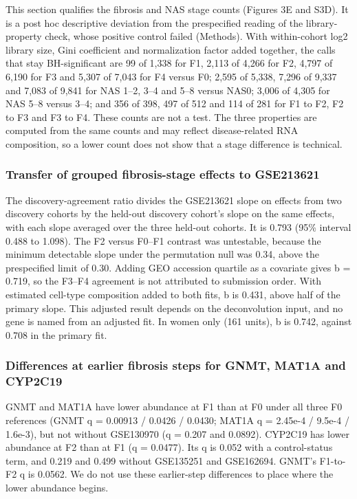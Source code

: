 This section qualifies the fibrosis and NAS stage counts (Figures 3E and S3D). It is a post hoc descriptive deviation from the prespecified reading of the library-property check, whose positive control failed (Methods). With within-cohort log2 library size, Gini coefficient and normalization factor added together, the calls that stay BH-significant are 99 of 1,338 for F1, 2,113 of 4,266 for F2, 4,797 of 6,190 for F3 and 5,307 of 7,043 for F4 versus F0; 2,595 of 5,338, 7,296 of 9,337 and 7,083 of 9,841 for NAS 1--2, 3--4 and 5--8 versus NAS0; 3,006 of 4,305 for NAS 5--8 versus 3--4; and 356 of 398, 497 of 512 and 114 of 281 for F1 to F2, F2 to F3 and F3 to F4. These counts are not a test. The three properties are computed from the same counts and may reflect disease-related RNA composition, so a lower count does not show that a stage difference is technical.

\subsubsection{Transfer of grouped fibrosis-stage effects to GSE213621}\label{transfer-of-grouped-fibrosis-stage-effects-to-gse213621}

The discovery-agreement ratio divides the GSE213621 slope on effects from two discovery cohorts by the held-out discovery cohort's slope on the same effects, with each slope averaged over the three held-out cohorts. It is 0.793 (95\% interval 0.488 to 1.098). The F2 versus F0--F1 contrast was untestable, because the minimum detectable slope under the permutation null was 0.34, above the prespecified limit of 0.30. Adding GEO accession quartile as a covariate gives b = 0.719, so the F3--F4 agreement is not attributed to submission order. With estimated cell-type composition added to both fits, b is 0.431, above half of the primary slope. This adjusted result depends on the deconvolution input, and no gene is named from an adjusted fit. In women only (161 units), b is 0.742, against 0.708 in the primary fit.

\subsubsection{Differences at earlier fibrosis steps for GNMT, MAT1A and CYP2C19}\label{differences-at-earlier-fibrosis-steps-for-gnmt-mat1a-and-cyp2c19}

GNMT and MAT1A have lower abundance at F1 than at F0 under all three F0 references (GNMT q = 0.00913 / 0.0426 / 0.0430; MAT1A q = 2.45e-4 / 9.5e-4 / 1.6e-3), but not without GSE130970 (q = 0.207 and 0.0892). CYP2C19 has lower abundance at F2 than at F1 (q = 0.0477). Its q is 0.052 with a control-status term, and 0.219 and 0.499 without GSE135251 and GSE162694. GNMT's F1-to-F2 q is 0.0562. We do not use these earlier-step differences to place where the lower abundance begins.

